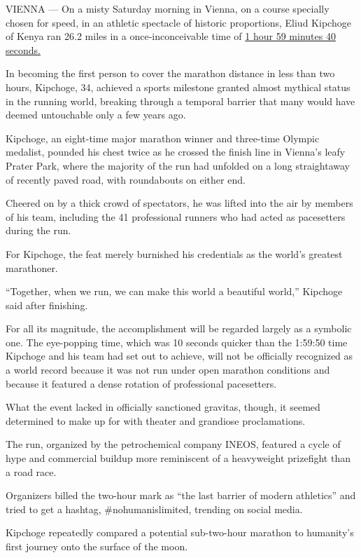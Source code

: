VIENNA --- On a misty Saturday morning in Vienna, on a course specially
chosen for speed, in an athletic spectacle of historic proportions,
Eliud Kipchoge of Kenya ran 26.2 miles in a once-inconceivable time of
\href{https://twitter.com/EliudKipchoge/status/1182934782684123136}{1
hour 59 minutes 40 seconds.}

In becoming the first person to cover the marathon distance in less than
two hours, Kipchoge, 34, achieved a sports milestone granted almost
mythical status in the running world, breaking through a temporal
barrier that many would have deemed untouchable only a few years ago.

Kipchoge, an eight-time major marathon winner and three-time Olympic
medalist, pounded his chest twice as he crossed the finish line in
Vienna's leafy Prater Park, where the majority of the run had unfolded
on a long straightaway of recently paved road, with roundabouts on
either end.

Cheered on by a thick crowd of spectators, he was lifted into the air by
members of his team, including the 41 professional runners who had acted
as pacesetters during the run.

For Kipchoge, the feat merely burnished his credentials as the world's
greatest marathoner.

``Together, when we run, we can make this world a beautiful world,''
Kipchoge said after finishing.

For all its magnitude, the accomplishment will be regarded largely as a
symbolic one. The eye-popping time, which was 10 seconds quicker than
the 1:59:50 time Kipchoge and his team had set out to achieve, will not
be officially recognized as a world record because it was not run under
open marathon conditions and because it featured a dense rotation of
professional pacesetters.

What the event lacked in officially sanctioned gravitas, though, it
seemed determined to make up for with theater and grandiose
proclamations.

The run, organized by the petrochemical company INEOS, featured a cycle
of hype and commercial buildup more reminiscent of a heavyweight
prizefight than a road race.

Organizers billed the two-hour mark as ``the last barrier of modern
athletics'' and tried to get a hashtag, \#nohumanislimited, trending on
social media.

Kipchoge repeatedly compared a potential sub-two-hour marathon to
humanity's first journey onto the surface of the moon.

